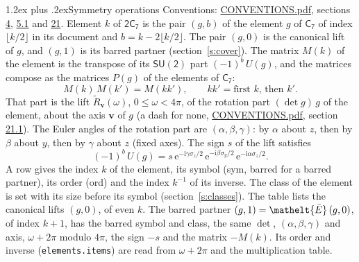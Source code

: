 \documentclass[10pt,a4paper]{article}
\makeatletter
\renewcommand\section{\@startsection{section}{1}{\z@}{-3ex plus -1ex minus -.2ex}%
  {1.2ex plus .2ex}{\normalfont\large\sffamily\bfseries\color{parttitle}}}
\numberwithin{equation}{section}
\newcommand{\eltfont}[1]{{\let\sigma\eltsigma\mathelt{#1}}}
\newcommand{\grp}[1]{\mathsf{#1}}
\newcommand{\elt}[1]{\eltfont{#1}}
\newcommand{\vv}{\mathbf{v}}
\newcommand{\iunit}{\mathrm{i}}
\newcommand{\expe}{\mathrm{e}}
\newcommand{\barred}[1]{\bar{#1}}
\newcommand{\lift}[1]{\tilde{#1}}
\newcommand{\pauli}[1]{\sigma_{#1}}
\makeatother
\begin{document}
\section{Symmetry operations}\label{s:elements}
Conventions: \href{../../CONVENTIONS.pdf}{CONVENTIONS.pdf}, sections \href{../../../rotation/CONVENTIONS.pdf\#conv.4}{4}, \href{../../../rotation/CONVENTIONS.pdf\#conv.5.1}{5.1} and \href{../../CONVENTIONS.pdf\#conv.21}{21}.
\leavevmode\label{n:index.element}\label{n:element.g}Element $k$ of $\grp{2C_{7}}$ is the pair $(g, b)$ of the element $g$ of \href{../../../rotation/data/pdf/C7.pdf}{$\grp{C_{7}}$} of index $\lfloor k/2\rfloor$ in its document and $b = k - 2\lfloor k/2\rfloor$. The pair $(g, 0)$ is the canonical lift of $g$, and $(g, 1)$ is its barred partner (section~\ref{s:cover}). \label{n:matrix.element.pin}\label{n:matrix.element}The matrix $M(k)$ of the element is the transpose of its $\grp{SU(2)}$ part $(-1)^{b}\,U(g)$, and the matrices compose as the matrices $P(g)$ of the elements of $\grp{C_{7}}$:
\begin{equation}\label{e:mprod}M(k)\,M(k') = M(kk'),\qquad kk' = \text{first } k\text{, then } k'.\end{equation}
\leavevmode\label{n:angle.omega}\label{n:vector.axis}\label{n:vector.pole}That part is the lift $\lift{R}_{\vv}(\omega)$, $0 \le \omega < 4\pi$, of the rotation part $(\det g)\,g$ of the element, about the axis $\vv$ of $g$ (a dash for none, \href{../../CONVENTIONS.pdf}{CONVENTIONS.pdf}, section \href{../../CONVENTIONS.pdf\#conv.21.1}{21.1}). \label{n:angle.euler.alpha}\label{n:angle.euler.beta}\label{n:angle.euler.gamma}\label{n:vector.coordinates}The Euler angles of the rotation part are $(\alpha,\beta,\gamma)$: by $\alpha$ about $z$, then by $\beta$ about $y$, then by $\gamma$ about $z$ (fixed axes). \label{n:local.euler.sign}The sign $s$ of the lift satisfies
\begin{equation}\label{e:euler}(-1)^{b}\,U(g) = s\,\expe^{-\iunit\gamma\pauli{z}/2}\,\expe^{-\iunit\beta\pauli{y}/2}\,\expe^{-\iunit\alpha\pauli{z}/2}.\end{equation}
\leavevmode\label{n:index.element.inverse}\label{n:head.sym}\label{n:head.ord}A row gives the index $k$ of the element, its symbol (sym, barred for a barred partner), its order (ord) and the index $k^{-1}$ of its inverse. \label{n:head.class}The class of the element is set with its size before its symbol (section~\ref{s:classes}).
The table lists the canonical lifts $(g, 0)$, of even $k$. The barred partner $(g, 1) = \elt{\barred{E}}\,(g, 0)$, of index $k + 1$, has the barred symbol and class, the same $\det$, $(\alpha,\beta,\gamma)$ and axis, $\omega + 2\pi$ modulo $4\pi$, the sign $-s$ and the matrix $-M(k)$. Its order and inverse (\texttt{elements.items}) are read from $\omega + 2\pi$ and the multiplication table.
\end{document}
